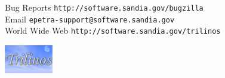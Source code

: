 \documentclass[11pt,twoside,titlepage]{EpetraDoc}
\begin{document}
\label{Contacts}
Bug Reports \hfill \texttt{http://software.sandia.gov/bugzilla} \\
Email \hfill \texttt{epetra-support@software.sandia.gov} \\
World Wide Web \hfill \texttt{http://software.sandia.gov/trilinos}

\vspace*{\fill}
\includegraphics[height=0.5in]{trilinos.eps}
\hfill

\cleardoublepage
\tableofcontents

\cleardoublepage
\listoffigures

\cleardoublepage
\listoftables

\clearpage



\cleardoublepage
%
%

\cleardoublepage
\printindex
%
\end{document}
